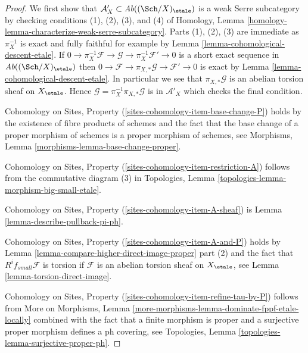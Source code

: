\begin{proof}
We first show that $\mathcal{A}'_X \subset \textit{Ab}((\Sch/X)_\etale)$
is a weak Serre subcategory by checking conditions (1), (2), (3), and (4)
of Homology, Lemma \ref{homology-lemma-characterize-weak-serre-subcategory}.
Parts (1), (2), (3) are immediate as $\pi_X^{-1}$ is exact and
fully faithful for example by Lemma \ref{lemma-cohomological-descent-etale}. If
$0 \to \pi_X^{-1}\mathcal{F} \to \mathcal{G} \to \pi_X^{-1}\mathcal{F}' \to 0$
is a short exact sequence in $\textit{Ab}((\Sch/X)_\etale)$
then $0 \to \mathcal{F} \to \pi_{X, *}\mathcal{G} \to \mathcal{F}' \to 0$
is exact by Lemma \ref{lemma-cohomological-descent-etale}.
In particular we see that $\pi_{X, *}\mathcal{G}$ is an abelian
torsion sheaf on $X_\etale$.
Hence $\mathcal{G} = \pi_X^{-1}\pi_{X, *}\mathcal{G}$ is in
$\mathcal{A}'_X$ which checks the final condition.

\medskip\noindent
Cohomology on Sites, Property (\ref{sites-cohomology-item-base-change-P}) holds
by the existence of fibre products of schemes
and the fact that the base change of a proper morphism of
schemes is a proper morphism of schemes, see
Morphisms, Lemma \ref{morphisms-lemma-base-change-proper}.

\medskip\noindent
Cohomology on Sites, Property (\ref{sites-cohomology-item-restriction-A})
follows from the commutative diagram (3) in
Topologies, Lemma \ref{topologies-lemma-morphism-big-small-etale}.

\medskip\noindent
Cohomology on Sites, Property (\ref{sites-cohomology-item-A-sheaf}) is
Lemma \ref{lemma-describe-pullback-pi-ph}.

\medskip\noindent
Cohomology on Sites, Property (\ref{sites-cohomology-item-A-and-P}) holds by
Lemma \ref{lemma-compare-higher-direct-image-proper} part (2)
and the fact that $R^if_{small}\mathcal{F}$
is torsion if $\mathcal{F}$ is an abelian torsion
sheaf on $X_\etale$, see Lemma \ref{lemma-torsion-direct-image}.

\medskip\noindent
Cohomology on Sites, Property (\ref{sites-cohomology-item-refine-tau-by-P})
follows from More on Morphisms, Lemma
\ref{more-morphisms-lemma-dominate-fppf-etale-locally}
combined with the fact that a finite morphism is proper
and a surjective proper morphism defines a ph covering, see
Topologies, Lemma \ref{topologies-lemma-surjective-proper-ph}.
\end{proof}

